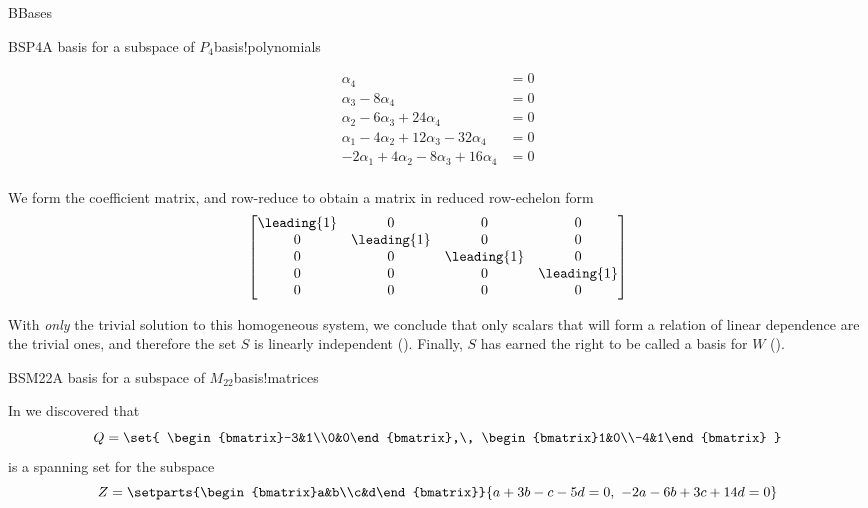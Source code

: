 \begin{subsect}{B}{Bases}
\begin{example}{BSP4}{A basis for a subspace of $P_4$}{basis!polynomials}
\begin{para}
%
\begin{align*}
\alpha_4&=0\\
\alpha_3-8\alpha_4&=0\\
\alpha_2-6\alpha_3+24\alpha_4&=0\\
\alpha_1-4\alpha_2+12\alpha_3-32\alpha_4&=0\\
-2\alpha_1+4\alpha_2-8\alpha_3+16\alpha_4&=0\\
\end{align*}
\end{para}
%
\begin{para}We form the coefficient matrix, and row-reduce to obtain a matrix in reduced row-echelon form
%
\begin{equation*}
\begin{bmatrix}
\leading{1}&0&0&0\\
0&\leading{1}&0&0\\
0&0&\leading{1}&0\\
0&0&0&\leading{1}\\
0&0&0&0
\end{bmatrix}
\end{equation*}
\end{para}
%
\begin{para}With {\em only} the trivial solution to this homogeneous system, we conclude that only scalars that will form a relation of linear dependence are the trivial ones, and therefore the set $S$ is linearly independent ().  Finally, $S$ has earned the right to be called a basis for $W$ ().
\end{para}
\end{example}
%
\begin{example}{BSM22}{A basis for a subspace of $M_{22}$}{basis!matrices}
\begin{para}In  we discovered that
%
\begin{equation*}
Q=\set{
\begin{bmatrix}-3&1\\0&0\end{bmatrix},\,
\begin{bmatrix}1&0\\-4&1\end{bmatrix}
}
\end{equation*}
%
is a spanning set for the subspace
%
\begin{equation*}
Z=\setparts{\begin{bmatrix}a&b\\c&d\end{bmatrix}}{a+3b-c-5d=0,\ -2a-6b+3c+14d=0}

\end{equation*}
\end{para}
\end{example}
\end{subsect}
